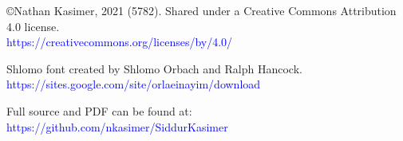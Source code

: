 \author{מסודר ע״י
\\
\textbf{ﭏיעזר בן זאב וואלף קזימיר}}
\date{נוסח אשכנז}

\maketitle

\begin{minipage}[b][\textheight][b]{\textwidth}
\begin{english}
\raggedright
\vfill
©Nathan Kasimer, 2021 (5782). Shared under a Creative Commons Attribution 4.0 license.\\
\textcolor{blue}{https://creativecommons.org/licenses/by/4.0/}\\ \vspace{\baselineskip}

Shlomo font created by Shlomo Orbach and Ralph Hancock.\\ \textcolor{blue}{https://sites.google.com/site/orlaeinayim/download}\\ \vspace{\baselineskip}

Full \XeLaTeX \quad source and PDF can be found at:\\ \textcolor{blue}{https://github.com/nkasimer/Siddur\textunderscore Kasimer}\\ \vspace{\baselineskip}


\end{english}
\end{minipage}
\clearpage
